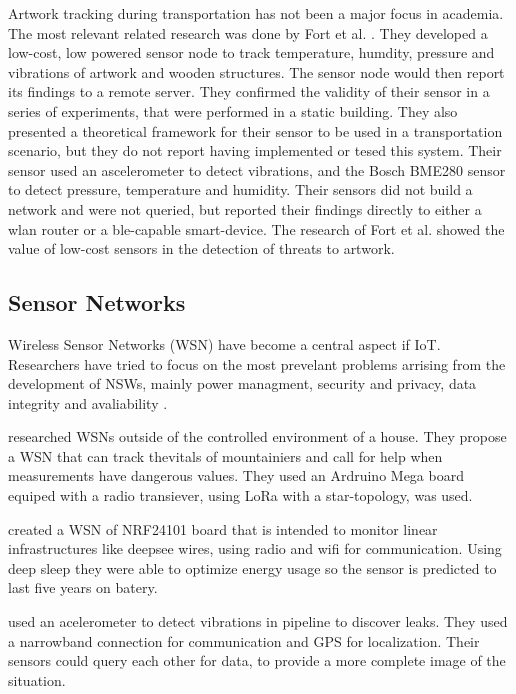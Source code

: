 Artwork tracking during transportation has not been a major focus in academia.
The most relevant related research was done by Fort et al. \cite{landi2022iot}.
They developed a low-cost, low powered sensor node to track temperature, humdity, pressure and vibrations of artwork and wooden structures.
The sensor node would then report its findings to a remote server.
They confirmed the validity of their sensor in a series of experiments, that were performed in a static building.
They also presented a theoretical framework for their sensor to be used in a transportation scenario, but they do not report having implemented or tesed this system.
Their sensor used an ascelerometer to detect vibrations, and the Bosch BME280 sensor to detect pressure, temperature and humidity.
Their sensors did not build a network and were not queried, but reported their findings directly to either a wlan router or a ble-capable smart-device.
The research of Fort et al. showed the value of low-cost sensors in the detection of threats to artwork.

\subsection{Sensor Networks}

Wireless Sensor Networks (WSN) have become a central aspect if IoT.
Researchers have tried to focus on the most prevelant problems arrising from the development of NSWs, mainly power managment, security and privacy, data integrity and avaliability \cite{gulati2022review}.


\cite{garg2021healthcare} researched WSNs outside of the controlled environment of a house. They propose a WSN that can track thevitals of mountainiers and call for help when measurements have dangerous values. 
They used an Ardruino Mega board equiped with a radio transiever, using LoRa with a star-topology, was used.


\cite{jones2021wireless} created a WSN of NRF24101 board that is intended to monitor linear infrastructures like deepsee wires, using radio and wifi for communication. Using deep sleep they were able to optimize energy usage so the sensor is predicted to last five years on batery.


\cite{spandonidis2022evaluation} used an acelerometer to detect vibrations in pipeline to discover leaks. 
They used a narrowband connection for communication and GPS for localization.
Their sensors could query each other for data, to provide a more complete image of the situation.


